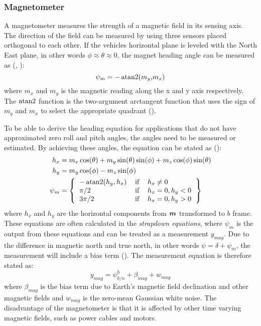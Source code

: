 \subsubsection*{Magnetometer}\label{sec:mag}
A magnetometer measures the strength of a magnetic field in its sensing axis. The direction of the field can be measured by using three sensors placed orthogonal to each other. If the vehicles horizontal plane is leveled with 
the North East plane, in other words $\phi\approx\theta\approx0$, the magnet heading angle can be measured as (\cite{Fossen2011}, \cite{beard2012small}):
\begin{equation}
  \psi_m=-\operatorname{atan2}(m_{y}\text{,}m_{x})
\end{equation}
where $m_{x}$ and $m_{y}$ is the magnetic reading along the x and y axis respectively. The $\operatorname{atan2}$ function is the two-argument arctangent function that uses the sign of $m_y$ and $m_x$ to select the 
appropriate quadrant (\cite{spong2006robot}).

To be able to derive the heading equation for applications that do not have approximated zero roll and pitch angles, the angles need to be measured or estimated. By achieving these angles, the equation 
can be stated as (\cite{Fossen2011}):
\begin{equation}
  \begin{split}
    h_x&=m_x \cos(\theta) + m_y\sin(\theta)\sin(\phi)+m_z\cos(\phi)\sin(\theta)\\
    h_y&=m_y\cos(\phi)-m_z\sin(\phi)\\
    \psi_m&=
    \left \{
      \begin{tabular}{lll}
	$-\atantwo(h_y,h_x)$ &$\text{if}$ & $h_x\neq0$ \\
	$\pi/2$ &$\text{if}$ &$h_x=0,h_y<0$ \\
	$3\pi/2$ &$\text{if}$ &$h_x=0,h_y>0$
      \end{tabular}
    \right \}
  \end{split}
\end{equation}
where $h_x$ and $h_y$ are the horizontal components from $\boldsymbol{m}$ transformed to $b$ frame. These equations are often calculated in the \textit{strapdown equations}, where $\psi_m$ is the output from these equations and 
can be treated as a measurement $y_{mag}$. Due to the difference in magnetic north and true north, in other words $\psi=\delta+\psi_m$, the measurement will include a bias term (\cite{beard2012small}). The measurement 
equation is therefore stated as:
\begin{equation}
  y_{mag}=\psi_{b/n}^{b}+\beta_{mag}+w_{mag}
\end{equation}
where $\beta_{mag}$ is the bias term due to Earth's magnetic field declination and other magnetic fields and $w_{mag}$ is the zero-mean Gaussian white noise. The disadvantage of the magnetometer is 
that it is affected by other time varying magnetic fields, such as power cables and motors. 


